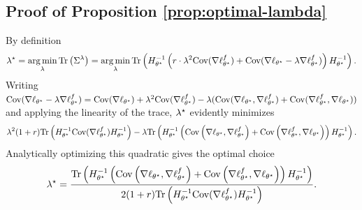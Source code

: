 



\subsection{Proof of Proposition \ref{prop:optimal-lambda}}
\label{sec:proof-optimal-lambda}

By definition
\begin{equation*}
  \lambda^\star = \operatorname*{arg\,min}_{\lambda} \mathrm{Tr}\left(\Sigma^\lambda\right) = \operatorname*{arg\,min}_{\lambda} \mathrm{Tr}\left(H_{\theta^\star}^{-1} \left(r \cdot \lambda^2 \textup{Cov}(\nabla \ell_{\theta^\star}^f) + \textup{Cov}( \nabla \ell_{\theta^\star} -  \lambda \nabla \ell_{\theta^\star}^f ) \right) H_{\theta^\star}^{-1}\right).
\end{equation*}
Writing $\textup{Cov}( \nabla \ell_{\theta^\star} - \lambda \nabla
\ell_{\theta^\star}^f ) = \textup{Cov}(\nabla \ell_{\theta^\star}) + \lambda^2
\textup{Cov}(\nabla \ell_{\theta^\star}^f) - \lambda (\mathrm{Cov}(\nabla
\ell_{\theta^\star}, \nabla \ell_{\theta^\star}^f) + \mathrm{Cov}(\nabla
\ell_{\theta^\star}^f, \nabla \ell_{\theta^\star} ))$ and applying the
linearity of the trace, $\lambda^\star$ evidently minimizes
\begin{align*}
\lambda^2(1+r) \mathrm{Tr}\left(H_{\theta^\star}^{-1} \textup{Cov}(\nabla \ell_{\theta^\star}^f)H_{\theta^\star}^{-1}\right) - \lambda \mathrm{Tr}\left(H_{\theta^\star}^{-1}\left(\mathrm{Cov}\left(\nabla \ell_{\theta^\star}, \nabla \ell_{\theta^\star}^f \right) + \mathrm{Cov}\left(\nabla \ell_{\theta^\star}^f, \nabla \ell_{\theta^\star} \right) \right)H_{\theta^\star}^{-1} \right).
\end{align*}
Analytically optimizing this quadratic gives the optimal choice
\begin{equation*}
  \lambda^\star = \frac{\mathrm{Tr}\left(H_{\theta^\star}^{-1}\left(\mathrm{Cov}\left(\nabla \ell_{\theta^\star}, \nabla \ell_{\theta^\star}^f \right) + \mathrm{Cov}\left(\nabla \ell_{\theta^\star}^f, \nabla \ell_{\theta^\star} \right) \right)H_{\theta^\star}^{-1} \right)}{2(1+r) \mathrm{Tr}\left(H_{\theta^\star}^{-1}\textup{Cov}(\nabla \ell_{\theta^\star}^f) H_{\theta^\star}^{-1} \right) }.
\end{equation*}
